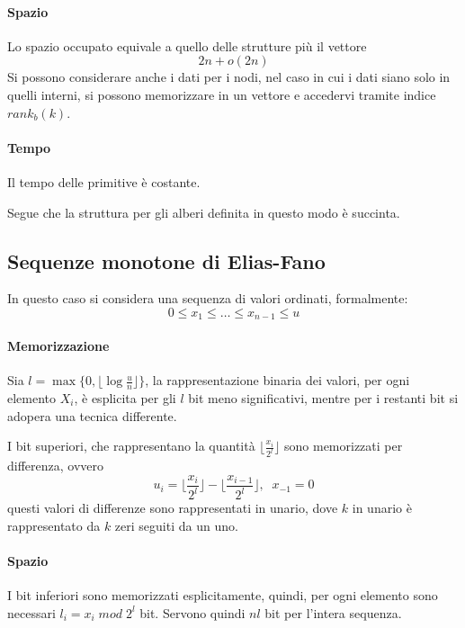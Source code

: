 \paragraph{Spazio}
Lo spazio occupato equivale a quello delle strutture più il vettore
 $$2n + o(2n)$$
Si possono considerare anche i dati per i nodi, nel caso in cui 
i dati siano solo in quelli interni, si possono memorizzare in un vettore 
e accedervi tramite indice $\mathit{rank}_b(k)$.

\paragraph{Tempo}
Il tempo delle primitive è costante.

Segue che la struttura per gli alberi definita in questo modo è succinta.

\subsection{Sequenze monotone di Elias-Fano}
In questo caso si considera una sequenza di valori ordinati, 
formalmente:
$$0 \leq x_1 \leq \dots \leq x_{n-1} \leq u$$

\paragraph{Memorizzazione}
Sia $l = \max\big\{0, \lfloor \log \frac{u}{n}\rfloor\big\}$, 
la rappresentazione binaria dei valori, per ogni elemento 
$X_i$, è esplicita per gli $l$ bit meno significativi, 
mentre per i restanti bit si adopera una tecnica differente.

I bit superiori, che rappresentano la quantità $\lfloor \frac{x_i}{2^l} \rfloor$
sono memorizzati per differenza, ovvero
$$u_i = \bigg\lfloor \frac{x_i}{2^l} \bigg\rfloor - \bigg\lfloor 
\frac{x_{i-1}}{2^l} \bigg\rfloor, \;\; x_{-1} = 0$$
questi valori di differenze sono rappresentati in unario, dove $k$ in unario è 
rappresentato da $k$ zeri seguiti da un uno.

\paragraph{Spazio}
I bit inferiori sono memorizzati esplicitamente, quindi, per ogni 
elemento sono necessari $l_i = x_i\;\mathit{mod}\;2^l$ bit. Servono 
quindi $nl$ bit per l'intera sequenza.

